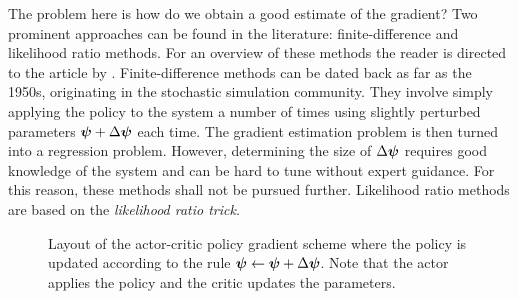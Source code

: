 The problem here is how do we obtain a good estimate of the gradient? Two prominent approaches can be found in the literature: finite-difference and likelihood ratio methods. For an overview of these methods the reader is directed to the article by \cite{PS08}. Finite-difference methods can be dated back as far as the 1950s, originating in the stochastic simulation community. They involve simply applying the policy to the system a number of times using slightly perturbed parameters $\boldsymbol{\psi}+\Delta\boldsymbol{\psi}$ each time. The gradient estimation problem is then turned into a regression problem. However, determining the size of $\Delta\boldsymbol{\psi}$ requires good knowledge of the system and can be hard to tune without expert guidance. For this reason, these methods shall not be pursued further. Likelihood ratio methods are based on the \textit{likelihood ratio trick}.



\begin{figure}
\centering

\caption{Layout of the actor-critic policy gradient scheme where the policy is updated according to the rule $\boldsymbol{\psi} \leftarrow \boldsymbol{\psi} + \Delta\boldsymbol{\psi}$. Note that the actor applies the policy and the critic updates the parameters.}
\label{fig:actorcritic}
\end{figure}


